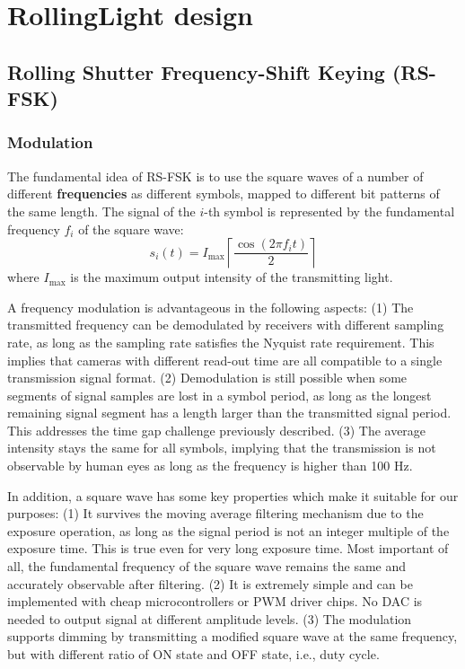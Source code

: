 \section{RollingLight design}



\subsection{Rolling Shutter Frequency-Shift Keying (RS-FSK) }
\subsubsection{Modulation}
The fundamental idea of RS-FSK is to use the square waves of a number of different \textbf{frequencies} as different symbols, mapped to different bit patterns of the same length. The signal of the $i$-th symbol is represented by the fundamental frequency $f_i$ of the square wave:
\begin{equation}
	s_i(t)= I_{\max} \left \lceil \frac{\cos (2 \pi f_i t)}{2} \right \rceil
\end{equation} where $I_{\max}$ is the maximum output intensity of the transmitting light.

A frequency modulation is advantageous in the following aspects:
(1) The transmitted frequency can be demodulated by receivers with different sampling rate, as long as the sampling rate satisfies the Nyquist rate requirement. This implies that cameras with different read-out time are all compatible to a single transmission signal format.
(2) Demodulation is still possible when some segments of signal samples are lost in a symbol period, as long as the longest remaining signal segment has a length larger than the transmitted signal period. This addresses the time gap challenge previously described.
(3) The average intensity stays the same for all symbols, implying that the transmission is not observable by human eyes as long as the frequency is higher than 100 Hz.

In addition, a square wave has some key properties which make it suitable for our purposes:
(1) It survives the moving average filtering mechanism due to the exposure operation, as long as the signal period is not an integer multiple of the exposure time. This is true even for very long exposure time. Most important of all, the fundamental frequency of the square wave remains the same and accurately observable after filtering.
(2) It is extremely simple and can be implemented with cheap microcontrollers or PWM driver chips. No DAC is needed to output signal at different amplitude levels.
(3) The modulation supports dimming by transmitting a modified square wave at the same frequency, but with different ratio of ON state and OFF state, i.e., duty cycle.

